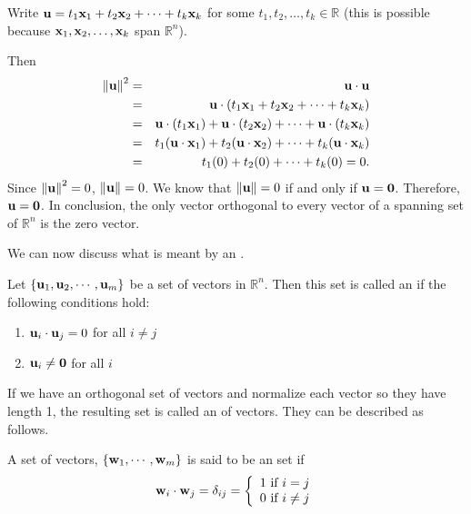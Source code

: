 \documentclass{ximera}
\begin{document}
\begin{explanation}
Write ${\bf u}=t_1{\bf x}_1 + t_2{\bf x}_2 +\cdots +t_k{\bf x}_k$
for some $t_1, t_2, \ldots, t_k\in\mathbb{R}$
(this is possible because
${\bf x}_1, {\bf x}_2, \ldots, {\bf x}_k$ span $\mathbb{R}^n$).

Then
\begin{eqnarray*}
\left\lVert{\bf u}\right\rVert^2 & = & {\bf u}\cdot{\bf u} \\
& = & {\bf u}\cdot(t_1{\bf x}_1 + t_2{\bf x}_2 +\cdots +t_k{\bf x}_k) \\
& = & {\bf u}\cdot (t_1{\bf x}_1) +  {\bf u}\cdot (t_2{\bf x}_2) +
\cdots +  {\bf u}\cdot (t_k{\bf x}_k) \\
& = & t_1({\bf u}\cdot {\bf x}_1) + t_2({\bf u}\cdot {\bf x}_2) + \cdots
+ t_k({\bf u}\cdot {\bf x}_k) \\
& = & t_1(0) + t_2(0) + \cdots + t_k(0) = 0.
\end{eqnarray*}
Since $\left\lVert{\bf u}\right\rVert^2 =0$, $\left\lVert{\bf u}\right\rVert =0$.
We know that $\left\lVert{\bf u}\right\rVert=0$ if and only if
${\bf u}={\bf 0}$.
Therefore, ${\bf u}={\bf 0}$.
In conclusion, the only vector orthogonal to every vector of
a spanning set of $\mathbb{R}^n$ is the zero vector.
\end{explanation}

We can now discuss what is meant by an . 

\begin{definition}\label{orthset}
Let $\{ {\bf u}_1, {\bf u}_2, \cdots, {\bf u}_m \}$ be a set of
vectors in $\mathbb{R}^n$. Then this set is called an
 if the following conditions hold:
\begin{enumerate}
\item
${\bf u}_i \cdot {\bf u}_j = 0$ for all $i \neq j$
\item
${\bf u}_i \neq {\bf 0}$ for all $i$
\end{enumerate}
\end{definition}

If we have an orthogonal set of vectors and normalize each vector so
they have length 1, the resulting set is called an  of vectors. They can be described as follows.

\begin{definition}\label{orthoSetVectors}
A set of vectors, $\left\{ {\bf w}_{1},\cdots ,{\bf w}_{m}\right\} $
is said to be an
 set if
\[
{\bf w}_i \cdot {\bf w}_j = \delta _{ij} = \left\{
\begin{array}{c}
1\text{ if }i=j \\
0\text{ if }i\neq j
\end{array}
\right.
\]
\end{definition}
\end{document}

